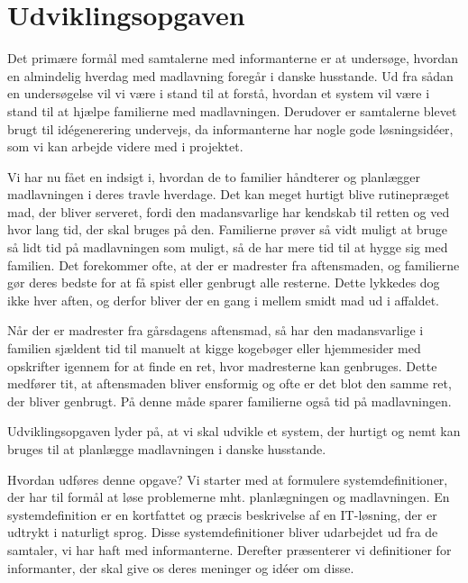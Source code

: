 \section{Udviklingsopgaven}
\label{sec:udviklingsopaven}

Det primære formål med samtalerne med informanterne er at undersøge, hvordan en almindelig hverdag med madlavning foregår i danske husstande. Ud fra sådan en undersøgelse vil vi være i stand til at forstå, hvordan et system vil være i stand til at hjælpe familierne med madlavningen. Derudover er samtalerne blevet brugt til idégenerering undervejs, da informanterne har nogle gode løsningsidéer, som vi kan arbejde videre med i projektet. 

Vi har nu fået en indsigt i, hvordan de to familier håndterer og planlægger madlavningen i deres travle hverdage. Det kan meget hurtigt blive rutinepræget mad, der bliver serveret, fordi den madansvarlige har kendskab til retten og ved hvor lang tid, der skal bruges på den. Familierne prøver så vidt muligt at bruge så lidt tid på madlavningen som muligt, så de har mere tid til at hygge sig med familien. Det forekommer ofte, at der er madrester fra aftensmaden, og familierne gør deres bedste for at få spist eller genbrugt alle resterne. Dette lykkedes dog ikke hver aften, og derfor bliver der en gang i mellem smidt mad ud i affaldet. 

Når der er madrester fra gårsdagens aftensmad, så har den madansvarlige i familien sjældent tid til manuelt at kigge kogebøger eller hjemmesider med opskrifter igennem for at finde en ret, hvor madresterne kan genbruges. Dette medfører tit, at aftensmaden bliver ensformig og ofte er det blot den samme ret, der bliver genbrugt. På denne måde sparer familierne også tid på madlavningen.

Udviklingsopgaven lyder på, at vi skal udvikle et system, der hurtigt og nemt kan bruges til at planlægge madlavningen i danske husstande. 

Hvordan udføres denne opgave? Vi starter med at formulere systemdefinitioner, der har til formål at løse problemerne mht. planlægningen og madlavningen. En systemdefinition er en kortfattet og præcis beskrivelse af en IT-løsning, der er udtrykt i naturligt sprog. Disse systemdefinitioner bliver udarbejdet ud fra de samtaler, vi har haft med informanterne. Derefter præsenterer vi definitioner for informanter, der skal give os deres meninger og idéer om disse.